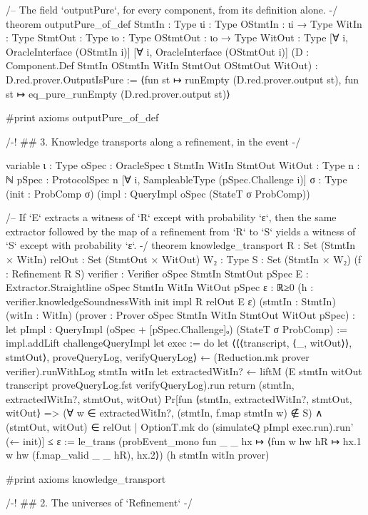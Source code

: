 \begin{leancode}
/-- The field `outputPure`, for every component, from its definition alone. -/
theorem outputPure_of_def {StmtIn : Type} {ιi : Type} {OStmtIn : ιi → Type} {WitIn : Type}
    {StmtOut : Type} {ιo : Type} {OStmtOut : ιo → Type} {WitOut : Type}
    [∀ i, OracleInterface (OStmtIn i)] [∀ i, OracleInterface (OStmtOut i)]
    (D : Component.Def StmtIn OStmtIn WitIn StmtOut OStmtOut WitOut) :
    D.red.prover.OutputIsPure :=
  ⟨fun st ↦ runEmpty (D.red.prover.output st),
    fun st ↦ eq_pure_runEmpty (D.red.prover.output st)⟩

#print axioms outputPure_of_def

/-! ## 3. Knowledge transports along a refinement, in the event -/

variable {ι : Type} {oSpec : OracleSpec ι} {StmtIn WitIn StmtOut WitOut : Type} {n : ℕ}
  {pSpec : ProtocolSpec n} [∀ i, SampleableType (pSpec.Challenge i)]
  {σ : Type} (init : ProbComp σ) (impl : QueryImpl oSpec (StateT σ ProbComp))

/-- If `E` extracts a witness of `R` except with probability `ε`, then the same extractor
followed by the map of a refinement from `R` to `S` yields a witness of `S` except with
probability `ε`. -/
theorem knowledge_transport {R : Set (StmtIn × WitIn)} {relOut : Set (StmtOut × WitOut)}
    {W₂ : Type} {S : Set (StmtIn × W₂)} (f : Refinement R S)
    {verifier : Verifier oSpec StmtIn StmtOut pSpec}
    {E : Extractor.Straightline oSpec StmtIn WitIn WitOut pSpec} {ε : ℝ≥0}
    (h : verifier.knowledgeSoundnessWith init impl R relOut E ε)
    (stmtIn : StmtIn) (witIn : WitIn)
    (prover : Prover oSpec StmtIn WitIn StmtOut WitOut pSpec) :
    let pImpl : QueryImpl (oSpec + [pSpec.Challenge]ₒ) (StateT σ ProbComp) :=
      impl.addLift challengeQueryImpl
    let exec := do
      let ⟨⟨⟨transcript, ⟨_, witOut⟩⟩, stmtOut⟩, proveQueryLog, verifyQueryLog⟩
        ← (Reduction.mk prover verifier).runWithLog stmtIn witIn
      let extractedWitIn? ←
        liftM (E stmtIn witOut transcript proveQueryLog.fst verifyQueryLog).run
      return (stmtIn, extractedWitIn?, stmtOut, witOut)
    Pr[fun ⟨stmtIn, extractedWitIn?, stmtOut, witOut⟩ =>
        (∀ w ∈ extractedWitIn?, (stmtIn, f.map stmtIn w) ∉ S) ∧ (stmtOut, witOut) ∈ relOut
      | OptionT.mk do (simulateQ pImpl exec.run).run' (← init)] ≤ ε :=
  le_trans (probEvent_mono fun _ _ hx ↦
    ⟨fun w hw hR ↦ hx.1 w hw (f.map_valid _ _ hR), hx.2⟩) (h stmtIn witIn prover)

#print axioms knowledge_transport

/-! ## 2. The universes of `Refinement` -/


\end{leancode}
